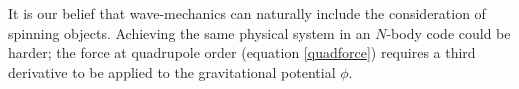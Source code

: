 It is our belief that wave-mechanics can naturally include the consideration of spinning objects. Achieving the same physical system in an $N$-body code could be harder; the force at quadrupole order (equation \ref{quadforce}) requires a third derivative to be applied to the gravitational potential $\phi$.











